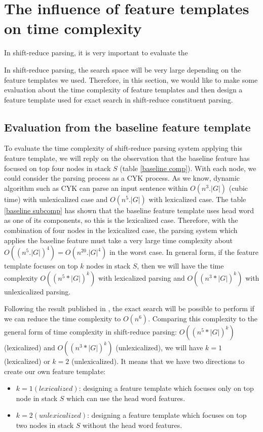 \section{The influence of feature templates on time complexity}
In shift-reduce parsing, it is very important to evaluate the 

In shift-reduce parsing, the search space will be very large depending on the feature templates we used. Therefore, in this section, we would like to make some evaluation about the time complexity of feature templates and then design a feature template used for exact search in shift-reduce constituent parsing.

\subsection{Evaluation from the baseline feature template}

To evaluate the time complexity of shift-reduce parsing system applying this feature template, we will reply on the observation that the baseline feature has focused on top four nodes in stack $S$ (table \ref{baseline comp}). With each node, we could consider the parsing process as a CYK process. As we know, dynamic algorithm such as CYK can parse an input sentence within $O(n^3.|G|)$ (cubic time) with unlexicalized case and $O(n^5.|G|)$ with lexicalized case. The table \ref{baseline subcomp} has shown that the baseline feature template uses head word as one of its components, so this is the lexicalized case. Therefore, with the combination of four nodes in the lexicalized case, the parsing system which applies the baseline feature must take a very large time complexity about $O((n^5.|G|)^4)=O(n^{20}.|G|^4)$ in the worst case. In general form, if the feature template focuses on top $k$ nodes in stack $S$, then we will have the time complexity $O((n^5*|G|)^k)$ with lexicalized parsing and $O((n^3*|G|)^k)$ with unlexicalized parsing.

Following the result published in \cite{2013Zhao}, the exact search will be possible to perform if we can reduce the time complexity to $O(n^6)$. Comparing this complexity to the general form of time complexity in shift-reduce parsing: $O((n^5*|G|)^k)$ (lexicalized) and $O((n^3*|G|)^k)$ (unlexicalized), we will have $k=1$ (lexicalized) or $k=2$ (unlexicalized). It means that we have two directions to create our own feature template:

\begin{itemize}
	\item $k=1(lexicalized)$: designing a feature template which focuses only on top node in stack $S$ which can use the head word features.
	\item $k=2(unlexicalized)$: designing a feature template which focuses on top two nodes in stack $S$ without the head word features.
\end{itemize}

